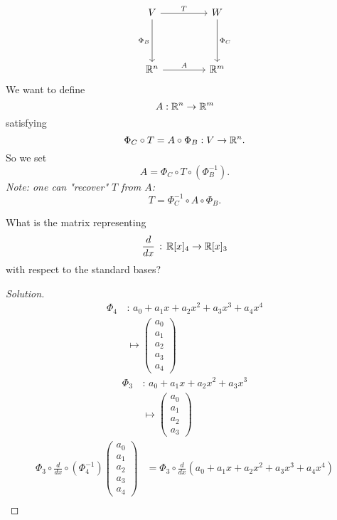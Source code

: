 \documentclass[10pt, a4paper]{article}
\begin{document}
\[
\begin{tikzcd}[row sep = 10ex, column sep = 10ex]
    V \arrow{r}{T} \arrow[swap]{d}{\Phi_B} & W \arrow{d}{\Phi_C} \\
    \R ^ n \arrow{r}{A}& \R ^ m
\end{tikzcd}
\]
We want to define
\[
A : \mathbb{R} ^ n \rightarrow \mathbb{R} ^ m
\]
satisfying
\[
\Phi_C \circ T = A \circ \Phi_B : V \rightarrow \mathbb{R} ^ n.
\]
So we set
\[
A = \Phi_C \circ T \circ (\Phi_B ^ {-1}).
\]
\textit{Note: one can "recover" $T$ from $A$:
\[
T = \Phi_C ^ {-1} \circ A \circ \Phi_B.
\]}

\begin{example}
    What is the matrix representing
    \[
    \frac{d}{dx}\,:\,\mathbb{R}[x]_4 \rightarrow \mathbb{R}[x]_3
    \]
    with respect to the standard bases?

    \begin{proof}[Solution]\renewcommand{\qedsymbol}{$\triangle$}
        \begin{align*}
            \Phi_4\,&:\,a_0 + a_1x + a_2x ^ 2 + a_3x ^ 3 + a_4x ^ 4 \\
            &\mapsto \begin{pmatrix}
                a_0 \\ a_1 \\ a_2 \\ a_3 \\ a_4
            \end{pmatrix}
        \end{align*}
        \begin{align*}
            \Phi_3\,&:\,a_0 + a_1x + a_2x ^ 2 + a_3x ^ 3 \\
            &\mapsto \begin{pmatrix}
                a_0 \\ a_1 \\ a_2 \\ a_3
            \end{pmatrix}
        \end{align*}
        \begin{align*}
            \Phi_3 \circ \frac{d}{dx} \circ (\Phi_4 ^ {-1})\begin{pmatrix}
                a_0 \\ a_1 \\ a_2 \\ a_3 \\ a_4
            \end{pmatrix} &= \Phi_3 \circ \frac{d}{dx}(a_0 + a_1x + a_2x ^ 2 + a_3x ^ 3 + a_4x ^ 4) \\

\end{align*}
\end{proof}
\end{example}
\end{document}
